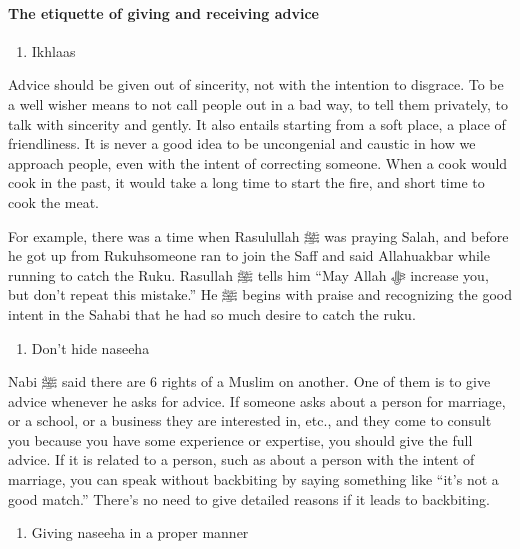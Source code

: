 \documentclass[
]{book}
\providecommand{\tightlist}{%
  \setlength{\itemsep}{0pt}\setlength{\parskip}{0pt}}
\begin{document}
\hypertarget{the-etiquette-of-giving-and-receiving-advice}{%
\paragraph{The etiquette of giving and receiving advice}\label{the-etiquette-of-giving-and-receiving-advice}}

\begin{enumerate}
\def\labelenumi{\arabic{enumi}.}
\tightlist
\item
  Ikhlaas
\end{enumerate}

Advice should be given out of sincerity, not with the intention to disgrace. To be a well wisher means to not call people out in a bad way, to tell them privately, to talk with sincerity and gently. It also entails starting from a soft place, a place of friendliness. It is never a good idea to be uncongenial and caustic in how we approach people, even with the intent of correcting someone. When a cook would cook in the past, it would take a long time to start the fire, and short time to cook the meat.

For example, there was a time when Rasulullah ﷺ was praying Salah, and before he got up from Rukuhsomeone ran to join the Saff and said Allahuakbar while running to catch the Ruku. Rasullah ﷺ tells him ``May Allah ﷻ increase you, but don't repeat this mistake.'' He ﷺ begins with praise and recognizing the good intent in the Sahabi that he had so much desire to catch the ruku.

\begin{enumerate}
\def\labelenumi{\arabic{enumi}.}
\setcounter{enumi}{1}
\tightlist
\item
  Don't hide naseeha
\end{enumerate}

Nabi ﷺ said there are 6 rights of a Muslim on another. One of them is to give advice whenever he asks for advice. If someone asks about a person for marriage, or a school, or a business they are interested in, etc., and they come to consult you because you have some experience or expertise, you should give the full advice. If it is related to a person, such as about a person with the intent of marriage, you can speak without backbiting by saying something like ``it's not a good match.'' There's no need to give detailed reasons if it leads to backbiting.

\begin{enumerate}
\def\labelenumi{\arabic{enumi}.}
\setcounter{enumi}{2}
\tightlist
\item
  Giving naseeha in a proper manner
\end{enumerate}
\end{document}
